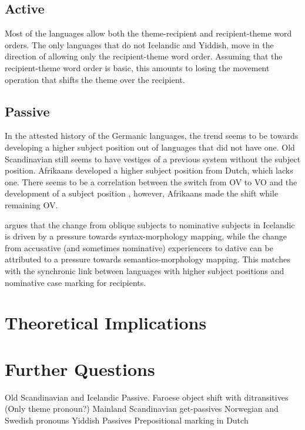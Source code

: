 \section{Active}
Most of the languages allow both the theme-recipient and recipient-theme word orders. The only languages that do not Icelandic and Yiddish, move in the direction of allowing only the recipient-theme word order. Assuming that the recipient-theme word order is basic, this amounts to losing the movement operation that shifts the theme over the recipient.
\section{Passive}
In the attested history of the Germanic languages, the trend seems to be towards developing a higher subject position out of languages that did not have one. Old Scandinavian still seems to have vestiges of a previous system without the subject position. Afrikaans developed a higher subject position from Dutch, which lacks one. There seems to be a correlation between the switch from OV to VO and the development of a subject position \citep{Besten.1990}, however, Afrikaans made the shift while remaining OV.

\cite{Eythorsson.2000} argues that the change from oblique subjects to nominative subjects in Icelandic is driven by a pressure towards syntax-morphology mapping, while the change from accusative (and sometimes nominative) experiencers to dative can be attributed to a pressure towards semantics-morphology mapping. This matches with the synchronic link between languages with higher subject positions and nominative case marking for recipients.

\chapter{Theoretical Implications}\label{chap:theory}
\chapter{Further Questions}\label{chap:furtherquest}
Old Scandinavian and Icelandic Passive.
Faroese object shift with ditransitives (Only theme pronoun?)
Mainland Scandinavian get-passives
Norwegian and Swedish pronouns
Yiddish Passives
Prepositional marking in Dutch

